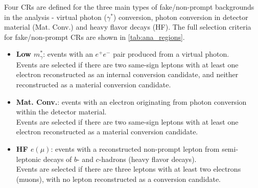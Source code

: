 \documentclass[../thesis.tex]{subfiles}
\begin{document}
Four \acs{CR}s are defined for the three main types of fake/non-prompt backgrounds in the analysis - virtual photon ($\gamma^{*}$) conversion, photon conversion in detector material (Mat. Conv.) and heavy flavor decays (\acs{HF}). The full selection criteria for fake/non-prompt \acs{CR}s are shown in \autoref{tab:ana_regions}.
\begin{itemize}
\item \textbf{Low $m_\gamma^{*}$}: events with an $e^+ e^-$ pair produced from a virtual photon.\\
Events are selected if there are two same-sign leptons with at least one electron reconstructed as an internal conversion candidate, and neither reconstructed as a material conversion candidate.
\item \textbf{Mat. Conv.}: events with an electron originating from photon conversion within the detector material.\\
Events are selected if there are two same-sign leptons with at least one electron reconstructed as a material conversion candidate.
\item \textbf{\acs{HF} $e(\mu)$}: events with a reconstructed non-prompt lepton from semi-leptonic decays of $b$- and $c$-hadrons (heavy flavor decays).\\
Events are selected if there are three leptons with at least two electrons (muons), with no lepton reconstructed as a conversion candidate.
\end{itemize}
%
\end{document}
